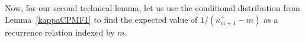 \documentclass[opre,nonblindrev]{informs3_no_remark}
\newcommand{\E}[1]{{\mathrm{E}\left[#1\right]}}
\newcommand{\PP}[1]{\mathrm{P}\left( #1 \right)}
\begin{document}
\hfill\Halmos\endproof

Now, for our second technical lemma, let us use the conditional distribution from Lemma~\ref{kappaCPMF1} to find the expected value of $1/(\kappa_{m+1}^+ - m)$ as a recurrence relation indexed by $m$.

\end{document}
